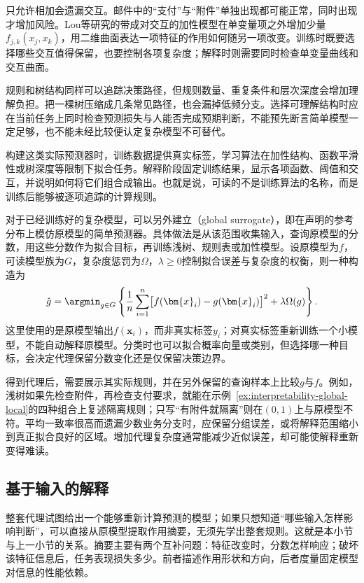 只允许相加会遗漏交互。邮件中的“支付”与“附件”单独出现都可能正常，同时出现才增加风险。Lou等研究的带成对交互的加性模型在单变量项之外增加少量$f_{j,k}(x_j,x_k)$，用二维曲面表达一项特征的作用如何随另一项改变。训练时既要选择哪些交互值得保留，也要控制各项复杂度；解释时则需要同时检查单变量曲线和交互曲面。

规则和树结构同样可以追踪决策路径，但规则数量、重复条件和层次深度会增加理解负担。把一棵树压缩成几条常见路径，也会漏掉低频分支。选择可理解结构时应在当前任务上同时检查预测损失与人能否完成预期判断，不能预先断言简单模型一定足够，也不能未经比较便认定复杂模型不可替代。

构建这类实际预测器时，训练数据提供真实标签，学习算法在加性结构、函数平滑性或树深度等限制下拟合任务。解释阶段固定训练结果，显示各项函数、阈值和交互，并说明如何将它们组合成输出。也就是说，可读的不是训练算法的名称，而是训练后能够被逐项追踪的计算规则。

对于已经训练好的复杂模型，可以另外建立（global surrogate），即在声明的参考分布上模仿原模型的简单预测器。具体做法是从该范围收集输入，查询原模型的分数，用这些分数作为拟合目标，再训练浅树、规则表或加性模型。设原模型为$f$，可读模型族为$G$，复杂度惩罚为$\Omega$，$\lambda\geq0$控制拟合误差与复杂度的权衡，则一种构造为
\begin{equation}
 \hat g=\argmin_{g\in G}\left\{
 \frac1n\sum_{i=1}^n\bigl[f(\bm{x}_i)-g(\bm{x}_i)\bigr]^2
 +\lambda\Omega(g)\right\}.
 \label{eq:interpretability-global-surrogate}
\end{equation}
这里使用的是原模型输出$f(\bm{x}_i)$，而非真实标签$y_i$；对真实标签重新训练一个小模型，不能自动解释原模型。分类时也可以拟合概率向量或类别，但选择哪一种目标，会决定代理保留分数变化还是仅保留决策边界。

得到代理后，需要展示其实际规则，并在另外保留的查询样本上比较$g$与$f$。例如，浅树如果先检查附件，再检查支付要求，就能在示例~\ref{ex:interpretability-global-local}的四种组合上复述隔离规则；只写“有附件就隔离”则在$(0,1)$上与原模型不符。平均一致率很高而遗漏少数业务分支时，应保留分组误差，或将解释范围缩小到真正拟合良好的区域。增加代理复杂度通常能减少近似误差，却可能使解释重新变得难读。

\subsection{基于输入的解释}
\label{sec:interpretability-global-dependence}

整套代理试图给出一个能够重新计算预测的模型；如果只想知道“哪些输入怎样影响判断”，可以直接从原模型提取作用摘要，无须先学出整套规则。这就是本小节与上一小节的关系。摘要主要有两个互补问题：特征改变时，分数怎样响应；破坏该特征信息后，任务表现损失多少。前者描述作用形状和方向，后者度量固定模型对信息的性能依赖。


